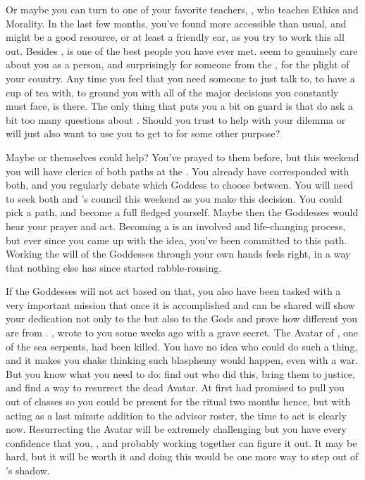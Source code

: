 \documentclass[char]{GL2020}
\begin{document}
Or maybe you can turn to one of your favorite teachers, \cEthics{\full}, who teaches Ethics and Morality. In the last few months, you've found \cEthics{\them} more accessible than usual, and \cEthics{\they} might be a good resource, or at least a friendly ear, as you try to work this all out. Besides \cFlowPriest{}, \cEthics{} is one of the best people you have ever met. \cEthics{\They} seem\cEthics{\verbs} to genuinely care about you as a person, and surprisingly for someone from the \pTech{}, for the plight of your country. Any time you feel that you need someone to just talk to, to have a cup of tea with, to ground you with all of the major decisions you constantly must face, \cEthics{} is there. The only thing that puts you a bit on guard is that \cEthics{\they} do ask a bit too many questions about \cLoud{}. Should you trust \cEthics{} to help with your dilemma or will \cEthics{\they} just also want to use you to get to \cLoud{} for some other purpose?  

Maybe \cEbb{} or \cFlow{} themselves could help? You've prayed to them before, but this weekend you will have clerics of both paths at the \pSc{}. You already have corresponded with both, and you regularly debate which Goddess to choose between. You will need to seek both \cFlowPriest{} and \cEbbPriest{}’s council this weekend as you make this decision. You could pick a path, and become a full fledged \cWarlordDaughter{\cleric} yourself. Maybe then the Goddesses would hear your prayer and act. Becoming a \cWarlordDaughter{\cleric} is an involved and life-changing process, but ever since you came up with the idea, you've been committed to this path. Working the will of the Goddesses through your own hands feels right, in a way that nothing else has since \cLoud{} started rabble-rousing.

If the Goddesses will not act based on that, you also have been tasked with a very important mission that once it is accomplished and can be shared will show your dedication not only to the \pShip{} but also to the Gods and prove how different you are from \cLoud{}. \cEbbPriest{}, wrote to you some weeks ago with a grave secret. The Avatar of \cEbb{}, one of the sea serpents, had been killed. You have no idea who could do such a thing, and it makes you shake thinking such blasphemy would happen, even with a war. But you know what you need to do: find out who did this, bring them to justice, and find a way to resurrect the dead Avatar. At first \cEbbPriest{} had promised to pull you out of classes so you could be present for the ritual two months hence, but with \cEbbPriest{} acting as a last minute addition to the advisor roster, the time to act is clearly now. Resurrecting the Avatar will be extremely challenging but you have every confidence that you, \cEbbPriest{}, \cFlowPriest{} and probably \cInitiate{} working together can figure it out. It may be hard, but it will be worth it and doing this would be one more way to step out of \cLoud{}’s shadow.
\end{document}

